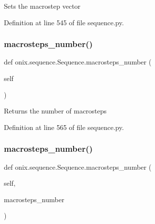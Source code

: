 \begin{DoxyVerb}Sets the macrostep vector\end{DoxyVerb}
 

Definition at line 545 of file sequence.\+py.

\mbox{\label{classonix_1_1sequence_1_1Sequence_a328276e48dc885626226ab678ff9c085}} 
\subsubsection{\texorpdfstring{macrosteps\+\_\+number()}{macrosteps\_number()}\hspace{0.1cm}{\footnotesize\ttfamily [1/2]}}
{\footnotesize\ttfamily def onix.\+sequence.\+Sequence.\+macrosteps\+\_\+number (\begin{DoxyParamCaption}\item[{}]{self }\end{DoxyParamCaption})}

\begin{DoxyVerb}Returns the number of macrosteps\end{DoxyVerb}
 

Definition at line 565 of file sequence.\+py.

\mbox{\label{classonix_1_1sequence_1_1Sequence_acf3011b7009e35380335cc1a1af4ee0a}} 
\subsubsection{\texorpdfstring{macrosteps\+\_\+number()}{macrosteps\_number()}\hspace{0.1cm}{\footnotesize\ttfamily [2/2]}}
{\footnotesize\ttfamily def onix.\+sequence.\+Sequence.\+macrosteps\+\_\+number (\begin{DoxyParamCaption}\item[{}]{self,  }\item[{}]{macrosteps\+\_\+number }\end{DoxyParamCaption})}

